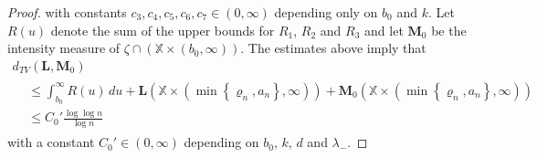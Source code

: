 \documentclass[AHL,Unicode,longabstracts]{cedram}
\newcommand*\bL{\mathbf{L}}
\newcommand*\bM{\mathbf{M}}
\newcommand*\X{\mathbb{X}}
\begin{document}
\begin{proof}
\noindent with constants $c_3,c_4,c_5,c_6,c_7\in(0,\infty)$ depending only on $b_0$ and $k$. Let $R(u)$ denote the sum of the upper bounds for $R_1$, $R_2$ and $R_3$ and let $\bM_0$ be the intensity measure of $\zeta\cap (\X \times (b_0,\infty))$. The estimates above imply that
\begin{multline}\label{e:dtvlmb}
d_{TV}\left(\bL, \bM_0\right)\\
\begin{aligned}
&\leq \int_{b_0}^\infty R(u) \, du + \bL\left({\X\times} \left(\min\left\{\varrho_n,a_n\right\},\infty\right)\right) + \bM_0\left({ \X\times } \left(\min\left\{\varrho_n,a_n\right\},\infty\right)\right)
\\
&\leq C_0' \frac{\log\log n}{\log n}
\end{aligned}
\end{multline}
with a constant $C_0'\in(0,\infty)$ depending on $b_0$, $k$, $d$ and $\lambda_-$.


\end{proof}
\end{document}

